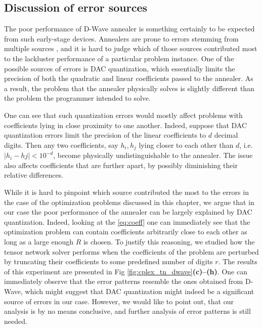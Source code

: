 \subsection{Discussion of error sources}

The poor performance of D-Wave annealer is something certainly to be expected
from such early-stage devices. Annealers are prone to errors stemming from
multiple sources \cite{dwavedocs}, and it is hard to judge which of those
sources contributed most to the lackluster performance of a particular problem
instance. One of the possible sources of errors is DAC quantization, which
essentially limits the precision of both the quadratic and linear coefficients
passed to the annealer. As a result, the problem that the annealer physically
solves is slightly different than the problem the programmer intended to solve.

One can see that such quantization errors would mostly affect problems with
coefficients lying in close proximity to one another. Indeed, suppose that DAC
quantization errors limit the precision of the linear coefficients to $d$
decimal digits. Then any two coefficients, say $h_{i}, h_{{j}}$ lying closer to
each other than $d$, i.e. $|h_{i} - h {j}| < 10^{-d}$, become physically
undistinguishable to the annealer. The issue also affects coefficients that are
further apart, by possibly diminishing their relative differences.

While it is hard to pinpoint which source contributed the most to the errors in
the case of the optimization problems discussed in this chapter, we argue that
in our case the poor performance of the annealer can be largely explained by
DAC quantization. Indeed, looking at the \eqref{eq:coeff} one can immediately
see that the optimization problem can contain coefficients arbitrarily close to
each other as long as a large enough $R$ is chosen. To justify this reasoning,
we studied how the tensor network solver performs when the coefficients of the
problem are perturbed by truncating their coefficients to some predefined
number of digits $r$. The results of this experiment are presented in Fig
\ref{fig:cplex_tn_dwave}\textbf{(c)--(h)}. One can immediately observe that the
error patterns resemble the ones obtained from D-Wave, which might suggest that
DAC quantization might indeed be a significant source of errors in our case.
However, we would like to point out, that our analysis is by no means
conclusive, and further analysis of error patterns is still needed.

